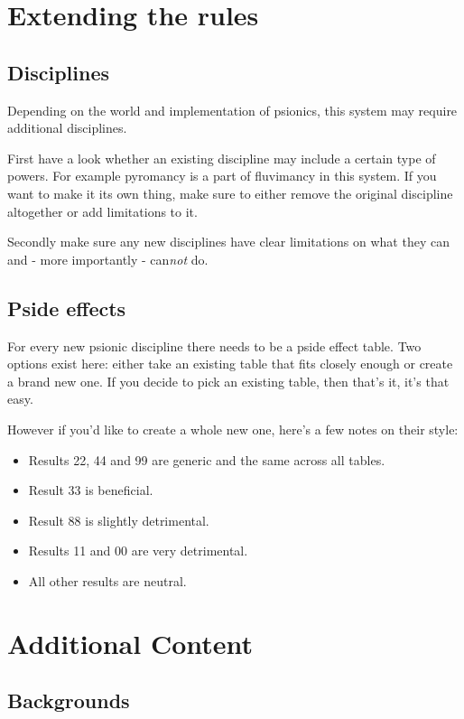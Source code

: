 \documentclass[12pt,a4paper,openany,usenames,dvipsnames]{book}
\begin{document}
	\chapter{Extending the rules}
	\section{Disciplines}
	Depending on the world and implementation of psionics, this system may require additional disciplines.\par
	First have a look whether an existing discipline may include a certain type of powers. For example pyromancy is a part of fluvimancy in this system. If you want to make it its own thing, make sure to either remove the original discipline altogether or add limitations to it.\par
	Secondly make sure any new disciplines have clear limitations on what they can and - more importantly - can\emph{not} do.
	\section{Pside effects}
	For every new psionic discipline there needs to be a pside effect table. Two options exist here: either take an existing table that fits closely enough or create a brand new one. If you decide to pick an existing table, then that's it, it's that easy.\par
	However if you'd like to create a whole new one, here's a few notes on their style:
	\begin{itemize}
		\item Results 22, 44 and 99 are generic and the same across all tables.
		\item Result 33 is beneficial.
		\item Result 88 is slightly detrimental.
		\item Results 11 and 00 are very detrimental.
		\item All other results are neutral.
	\end{itemize}

	\chapter{Additional Content}
	\label{ch:addcontent}
	\section{Backgrounds}
	\label{sec:backgroundlist}
\end{document}
